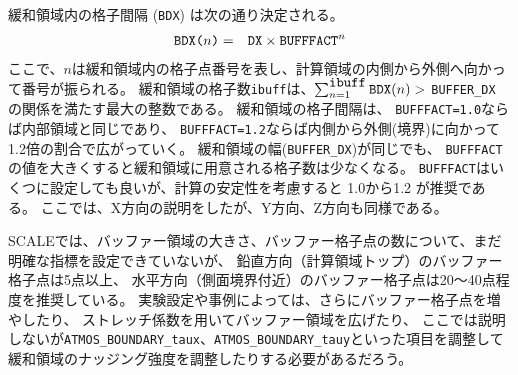 緩和領域内の格子間隔 (\verb|BDX|) は次の通り決定される。
\begin{eqnarray}
 \verb|BDX(|n\verb|)| &=& \verb|DX| \times \verb|BUFFFACT|^n \nonumber
\end{eqnarray}
ここで、$n$は緩和領域内の格子点番号を表し、計算領域の内側から外側へ向かって番号が振られる。
緩和領域の格子数\verb|ibuff|は、$\sum_{n=1}^{\verb|ibuff|} \verb|BDX|(n) >$ \verb|BUFFER_DX| の関係を満たす最大の整数である。
%
緩和領域の格子間隔は、
\verb|BUFFFACT=1.0|ならば内部領域と同じであり、
\verb|BUFFFACT=1.2|ならば内側から外側(境界)に向かって1.2倍の割合で広がっていく。
緩和領域の幅(\verb|BUFFER_DX|)が同じでも、
\verb|BUFFFACT|の値を大きくすると緩和領域に用意される格子数は少なくなる。
\verb|BUFFFACT|はいくつに設定しても良いが、計算の安定性を考慮すると 1.0から1.2 が推奨である。
ここでは、X方向の説明をしたが、Y方向、Z方向も同様である。


SCALEでは、バッファー領域の大きさ、バッファー格子点の数について、まだ明確な指標を設定できていないが、
鉛直方向（計算領域トップ）のバッファー格子点は5点以上、
水平方向（側面境界付近）のバッファー格子点は20〜40点程度を推奨している。
実験設定や事例によっては、さらにバッファー格子点を増やしたり、
ストレッチ係数を用いてバッファー領域を広げたり、
ここでは説明しないが\verb|ATMOS_BOUNDARY_taux|、\verb|ATMOS_BOUNDARY_tauy|といった項目を調整して
緩和領域のナッジング強度を調整したりする必要があるだろう。

